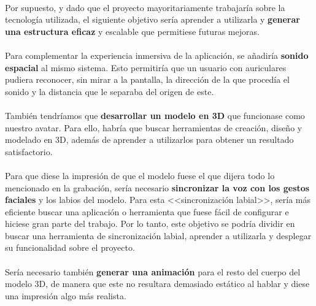 \documentclass{subfiles}
\begin{document}
        \paragraph{}
        {Por supuesto, y dado que el proyecto mayoritariamente trabajaría sobre la tecnología utilizada, el siguiente objetivo sería aprender a utilizarla y \textbf{generar una estructura eficaz} y escalable que permitiese futuras mejoras.}

        \paragraph{}
        {Para complementar la experiencia inmersiva de la aplicación, se añadiría \textbf{sonido espacial} al mismo sistema. Esto permitiría que un usuario con auriculares pudiera reconocer, sin mirar a la pantalla, la dirección de la que procedía el sonido y la distancia que le separaba del origen de este.}
        
        \paragraph{}
        {También tendríamos que \textbf{desarrollar un modelo en 3D} que funcionase como nuestro avatar. Para ello, habría que buscar herramientas de creación, diseño y modelado en 3D, además de aprender a utilizarlos para obtener un resultado satisfactorio.}
        
        \paragraph{}
        {Para que diese la impresión de que el modelo fuese el que dijera todo lo mencionado en la grabación, sería necesario \textbf{sincronizar la voz con los gestos faciales} y los labios del modelo. Para esta <<sincronización labial>>, sería más eficiente buscar una aplicación o herramienta que fuese fácil de configurar e hiciese gran parte del trabajo. Por lo tanto, este objetivo se podría dividir en buscar una herramienta de sincronización labial, aprender a utilizarla y desplegar su funcionalidad sobre el proyecto.}
        
        \paragraph{}
        {Sería necesario también \textbf{generar una animación} para el resto del cuerpo del modelo 3D, de manera que este no resultara demasiado estático al hablar y diese una impresión algo más realista.}
        
\end{document}
